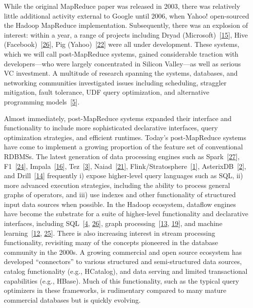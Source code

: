 \documentclass[b5paper,11pt,twoside,openright]{book}
\begin{document}
While the original MapReduce paper was released in 2003, there was
relatively little additional activity external to Google until 2006,
when Yahoo! open-sourced the Hadoop MapReduce implementation.
Subsequently, there was an explosion of interest: within a year, a range
of projects including Dryad
(Microsoft)~{{[}\protect\hyperlink{ref-dryad}{15}{]}}, Hive
(Facebook)~{{[}\protect\hyperlink{ref-hive}{26}{]}}, Pig
(Yahoo)~{{[}\protect\hyperlink{ref-pig}{22}{]}} were all under
development. These systems, which we will call post-MapReduce systems,
gained considerable traction with developers---who were largely
concentrated in Silicon Valley---as well as serious VC investment. A
multitude of research spanning the systems, databases, and networking
communities investigated issues including scheduling, straggler
mitigation, fault tolerance, UDF query optimization, and alternative
programming models~{{[}\protect\hyperlink{ref-fnt-mr}{5}{]}}.

Almost immediately, post-MapReduce systems expanded their interface and
functionality to include more sophisticated declarative interfaces,
query optimization strategies, and efficient runtimes. Today's
post-MapReduce systems have come to implement a growing proportion of
the feature set of conventional RDBMSs. The latest generation of data
processing engines such as
Spark~{{[}\protect\hyperlink{ref-spark}{27}{]}},
F1~{{[}\protect\hyperlink{ref-f1}{24}{]}},
Impala~{{[}\protect\hyperlink{ref-impala}{16}{]}},
Tez~{{[}\protect\hyperlink{ref-tez}{3}{]}},
Naiad~{{[}\protect\hyperlink{ref-naiad}{21}{]}},
Flink/Stratosphere~{{[}\protect\hyperlink{ref-stratosphere}{1}{]}},
AsterixDB~{{[}\protect\hyperlink{ref-asterixdb}{2}{]}}, and
Drill~{{[}\protect\hyperlink{ref-drill}{14}{]}} frequently i) expose
higher-level query languages such as SQL, ii) more advanced execution
strategies, including the ability to process general graphs of
operators, and iii) use indexes and other functionality of structured
input data sources when possible. In the Hadoop ecosystem, dataflow
engines have become the substrate for a suite of higher-level
functionality and declarative interfaces, including
SQL~{{[}\protect\hyperlink{ref-sparksql}{4},
  \protect\hyperlink{ref-hive}{26}{]}}, graph
processing~{{[}\protect\hyperlink{ref-graphx}{13},
  \protect\hyperlink{ref-pregel}{19}{]}}, and machine
learning~{{[}\protect\hyperlink{ref-systemml}{12},
  \protect\hyperlink{ref-mllib}{25}{]}}. There is also increasing interest
in stream processing functionality, revisiting many of the concepts
pioneered in the database community in the 2000s. A growing commercial
and open source ecosystem has developed ``connectors'' to various
structured and semi-structured data sources, catalog functionality
(e.g., HCatalog), and data serving and limited transactional
capabilities (e.g., HBase). Much of this functionality, such as the
typical query optimizers in these frameworks, is rudimentary compared to
many mature commercial databases but is quickly evolving.
\end{document}
